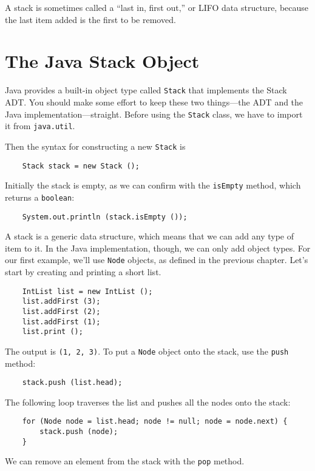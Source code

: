 A stack is sometimes called a ``last in, first out,'' or LIFO
data structure, because the last item added is the first to
be removed.


\section {The Java Stack Object}

Java provides a built-in object type called {\tt Stack} that
implements the Stack ADT.  You should make some effort to keep
these two things---the ADT and the Java implementation---straight.
Before using the {\tt Stack} class, we have to import it from
{\tt java.util}.

Then the syntax for constructing a new {\tt Stack} is

\begin{verbatim}
    Stack stack = new Stack ();
\end{verbatim}
%
Initially the stack is empty, as we can confirm with the
{\tt isEmpty} method, which returns a {\tt boolean}:

\begin{verbatim}
    System.out.println (stack.isEmpty ());
\end{verbatim}
%
A stack is a generic data structure, which means that we can
add any type of item to it.  In the Java implementation, though,
we can only add object types.  For our first example, we'll
use {\tt Node} objects, as defined in the previous chapter.
Let's start by creating and printing a short list.

\begin{verbatim}
    IntList list = new IntList ();
    list.addFirst (3);
    list.addFirst (2);
    list.addFirst (1);
    list.print ();
\end{verbatim}
%
The output is {\tt (1, 2, 3)}.  To put a {\tt Node} object onto
the stack, use the {\tt push} method:

\begin{verbatim}
	stack.push (list.head);
\end{verbatim}
%
The following loop traverses the list and pushes all the nodes
onto the stack:

\begin{verbatim}
    for (Node node = list.head; node != null; node = node.next) {
        stack.push (node);
    }
\end{verbatim}
%
We can remove an element from the stack with the {\tt pop} method.

